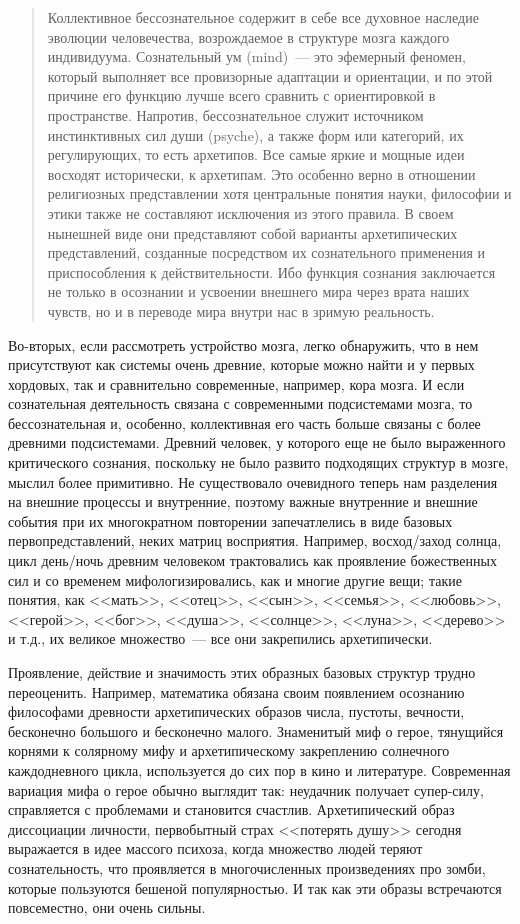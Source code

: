 \documentclass[a4paper,14pt,oneside]{memoir}
\begin{document}
\begin{quotation}
Коллективное бессознательное содержит в себе все духовное наследие эволюции человечества, возрождаемое в структуре мозга каждого индивидуума. Сознательный ум (mind)~--- это эфемерный феномен, который выполняет все провизорные адаптации и ориентации, и по этой причине его функцию лучше всего сравнить с ориентировкой в пространстве. Напротив, бессознательное служит источником инстинктивных сил души (psyche), а также форм или категорий, их регулирующих, то есть архетипов. Все самые яркие и мощные идеи восходят исторически, к архетипам. Это особенно верно в отношении религиозных представлении хотя центральные понятия науки, философии и этики также не составляют исключения из этого правила. В своем нынешней виде они представляют собой варианты архетипических представлений, созданные посредством их сознательного применения и приспособления к действительности. Ибо функция сознания заключается не только в осознании и усвоении внешнего мира через врата наших чувств, но и в переводе мира внутри нас в зримую реальность. 
\end{quotation}


Во-вторых, если рассмотреть устройство мозга, легко обнаружить, что в нем присутствуют как системы очень древние, которые можно найти и у первых хордовых, так и сравнительно современные, например, кора мозга. И если сознательная деятельность связана с современными подсистемами мозга, то бессознательная и, особенно, коллективная его часть больше связаны с более древними подсистемами. Древний человек, у которого еще не было выраженного критического сознания, поскольку не было развито подходящих структур в мозге, мыслил более примитивно. Не существовало очевидного теперь нам разделения на внешние процессы и внутренние, поэтому важные внутренние и внешние события при их многократном повторении запечатлелись в виде базовых первопредставлений, неких матриц восприятия. Например, восход/заход солнца, цикл день/ночь древним человеком трактовались как проявление божественных сил и со временем мифологизировались, как и многие другие вещи; такие понятия, как <<мать>>, <<отец>>, <<сын>>, <<семья>>, <<любовь>>, <<герой>>, <<бог>>, <<душа>>, <<солнце>>, <<луна>>, <<дерево>> и т.д., их великое множество~--- все они закрепились архетипически.

Проявление, действие и значимость этих образных базовых структур трудно переоценить. Например, математика обязана своим появлением осознанию философами древности архетипических образов числа, пустоты, вечности, бесконечно большого и бесконечно малого. Знаменитый миф о герое, тянущийся корнями к солярному мифу и архетипическому закреплению солнечного каждодневного цикла, используется до сих пор в кино и литературе. Современная вариация мифа о герое обычно выглядит так: неудачник получает супер-силу, справляется с проблемами и становится счастлив. Архетипический образ диссоциации личности, первобытный страх <<потерять душу>> сегодня выражается в идее массого психоза, когда множество людей теряют сознательность, что проявляется в многочисленных произведениях про зомби, которые пользуются бешеной популярностью. И так как эти образы встречаются повсеместно, они очень сильны.
\end{document}

